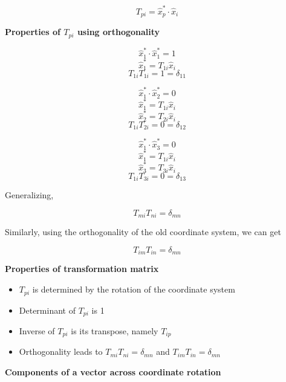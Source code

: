 $$ T_{pi} =  \hat{x}^*_p \cdot \hat{x}_i $$



{\bf Properties of $T_{pi}$ using orthogonality}

$$ \hat{x}^*_1 \cdot \hat{x}^*_1 = 1 $$
$$ \hat{x}^*_1 = T_{1i} \hat{x}_i $$
$$ T_{1i} T_{1i} = 1 = \delta_{11} $$

$$ \hat{x}^*_1 \cdot \hat{x}^*_2 = 0 $$
$$ \hat{x}^*_1 = T_{1i} \hat{x}_i $$
$$ \hat{x}^*_2 = T_{2i} \hat{x}_i $$
$$ T_{1i} T_{2i} = 0 = \delta_{12} $$

$$ \hat{x}^*_1 \cdot \hat{x}^*_3 = 0 $$
$$ \hat{x}^*_1 = T_{1i} \hat{x}_i $$
$$ \hat{x}^*_3 = T_{3i} \hat{x}_i $$
$$ T_{1i} T_{3i} = 0 = \delta_{13} $$

Generalizing,

$$ T_{mi} T_{ni} = \delta_{mn} $$

Similarly, using the orthogonality of the old coordinate system, we can get

$$ T_{im} T_{in} = \delta_{mn} $$



{\bf Properties of transformation matrix}

\begin{itemize}
\item $T_{pi}$ is determined by the rotation of the coordinate system
\item Determinant of $T_{pi}$ is 1
\item Inverse of $T_{pi}$ is its transpose, namely $T_{ip}$
\item Orthogonality leads to $ T_{mi} T_{ni} = \delta_{mn} $ and $ T_{im} T_{in} = \delta_{mn} $
\end{itemize}



{\bf Components of a vector across coordinate rotation}

